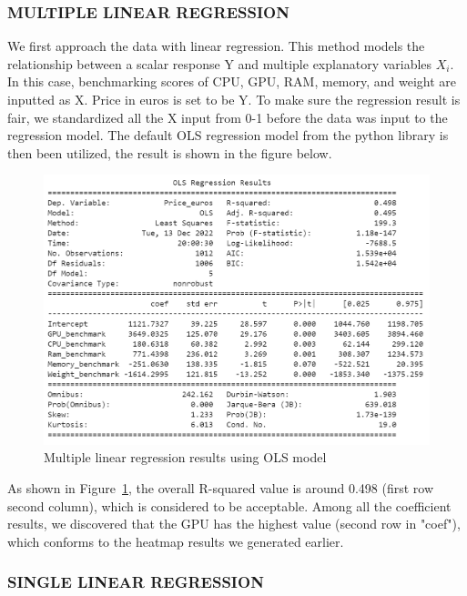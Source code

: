 \documentclass{scrartcl}
\begin{document}
\subsubsection{MULTIPLE LINEAR REGRESSION}

We first approach the data with linear regression. This method models the relationship between a scalar response Y and multiple explanatory variables $X_i$. In this case, benchmarking scores of CPU, GPU, RAM, memory, and weight are inputted as X. Price in euros is set to be Y. To make sure the regression result is fair, we standardized all the X input from 0-1 before the data was input to the regression model. The default OLS regression model from the python library\cite{chen} is then been utilized, the result is shown in the figure below.

\begin{figure}[H]
	\begin{center}
		\includegraphics[scale=0.6]{Graphics/4520 final/OLS_regression.png}
	\end{center}
	\caption{Multiple linear regression results using OLS model}
	\label{fig:OLS}
\end{figure}

\noindent As shown in Figure~\ref{fig:OLS}, the overall R-squared value is around 0.498 (first row second column), which is considered to be acceptable. Among all the coefficient results, we discovered that the GPU has the highest value (second row in "coef"), which conforms to the heatmap results we generated earlier. 

\subsubsection{SINGLE LINEAR REGRESSION}
\end{document}

